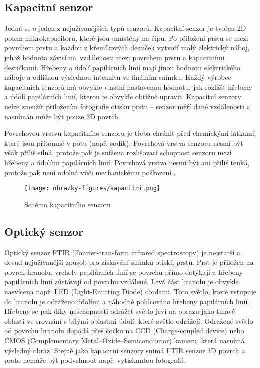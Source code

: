 \subsection*{Kapacitní senzor}
Jedná se o jeden z nejužívanějších typů senzorů. Kapacitní senzor je tvořen 2D polem mikrokapacitorů, které jsou umístěny na čipu. Po přiložení prstu se mezi povrchem prstu a každou z křemíkových destiček vytvoří malý elektrický náboj, jehož hodnota závisí na~vzdálenosti mezi povrchem prstu a kapacitními destičkami. Hřebeny a údolí papilárních linií mají jinou hodnotu elektrického náboje a odlišnou výslednou intenzitu ve finálním snímku. Každý výrobce kapacitních senzorů má obvykle vlastní nastavenou hodnotu, jak rozlišit hřebeny a údolí papilárních linií, kterou je obvykle obtížné upravit. Kapacitní senzory nelze zneužít přiložením fotografie otisku prstu -- senzor měří dané vzdálenosti a nasnímán může být pouze 3D povrch. 

Povrchovou vrstvu kapacitního senzoru je třeba chránit před chemickými látkami, které jsou přítomné v potu (např. sodík). Povrchová vrstva senzoru nesmí být však příliš silná, protože pak je snížena rozlišovací schopnost senzoru mezi hřebeny a údolími papilárních linií. Povrchová vrstva nesmí být ani příliš tenká, protože pak není odolná vůči mechanickému poškození \cite{Maltoni2009}. 

\begin{figure}[!htbp]
    \centering
    \texttt{[image: obrazky-figures/kapacitni.png]}
    \caption{Schéma kapacitního senzoru \cite{Maltoni2009}}
\end{figure}

\subsection*{Optický senzor}
Optický senzor FTIR (Fourier-transform infrared spectroscopy) je nejstarší a dosud nejužívanější způsob pro získávání snímků otisků prstů. Prst je přiložen na povrch hranolu, vrcholy papilárních linií se povrchu přímo dotýkají a hřebeny papilárních linií zůstávají od povrchu vzdálené. Levá část hranolu je obvykle nasvícena např. LED (Light-Emitting Diode) diodami. Toto světlo, které vstupuje do hranolu je odráženo údolími a náhodně pohlcováno hřebeny papilárních linií. Hřebeny se pak díky neschopnosti odrážet světlo jeví na obrazu jako tmavé oblasti ve srovnání s bílými oblastmi údolí. které světlo odrážejí. Odražené světlo od povrchu hranolu dopadá přeš čočku na CCD (Charge-coupled device) nebo CMOS (Complementary Metal–Oxide–Semiconductor) kameru, která nasnímá výsledný obraz. Stejně jako kapacitní senzory snímá FTIR senzor 3D povrch a proto nemůže být podvrhnout např. vytisknutou fotografií.

